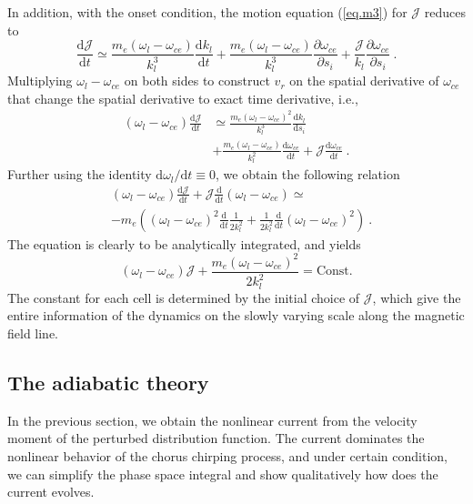In addition, with the onset condition, the motion equation (\ref{eq.m3}) for $\mathcal{J}$ reduces to
\begin{equation}
        \frac{\mathrm{d}\mathcal{J}}{\mathrm{d}t} \simeq  \frac{m_e(\omega_l - \omega_{ce})}{k_l^3} \frac{\mathrm{d} k_l}{\mathrm{d} t} + \frac{m_e(\omega_l - \omega_{ce})}{k_l^3} \frac{\partial \omega_{ce}}{\partial s_i}  +\frac{\mathcal{J}}{k_l}\frac{\partial \omega_{ce}}{\partial s_i}~.
\end{equation}
Multiplying $\omega_l - \omega_{ce}$ on both sides to construct $v_r$ on the spatial derivative of $\omega_{ce}$ that change the spatial derivative to exact time derivative, i.e., 
\begin{equation}
\begin{aligned}
    (\omega_l - \omega_{ce}) \frac{\mathrm{d}\mathcal{J}}{\mathrm{d}t} & \simeq \frac{m_e(\omega_l - \omega_{ce})^2}{k_l^3} \frac{\mathrm{d} k_l}{\mathrm{d} s_i} \\ 
    &+ \frac{m_e(\omega_l - \omega_{ce})}{k_l^2} \frac{\mathrm{d} \omega_{ce}}{\mathrm{d} t} + \mathcal{J}\frac{\mathrm{d} \omega_{ce}}{\mathrm{d} t}~.
\end{aligned}
\end{equation}
Further using the identity $\mathrm{d}\omega_l/\mathrm{d}t \equiv 0$, we obtain the following relation
\begin{equation}
\begin{aligned}
    &(\omega_l - \omega_{ce}) \frac{\mathrm{d}\mathcal{J}}{\mathrm{d}t} + \mathcal{J}\frac{\mathrm{d}}{\mathrm{d} t}(\omega_l - \omega_{ce}) \simeq 
    \\
    &- m_e\left((\omega_l - \omega_{ce})^2 \frac{\mathrm{d}}{\mathrm{d} t}\frac{1}{2 k_l^2} + \frac{1}{2 k_l^2} \frac{\mathrm{d}}{\mathrm{d} t}(\omega_l - \omega_{ce})^2\right)~.
\end{aligned}
\end{equation}
The equation is clearly to be analytically integrated, and yields
\begin{equation}\label{eq.Jcons}
    (\omega_l - \omega_{ce})\mathcal{J} +  \frac{m_e(\omega_l - \omega_{ce})^2}{2k_l^2} = \mathrm{Const.}
\end{equation}
The constant for each cell is determined by the initial choice of $\mathcal{J}$, which give the entire information of the dynamics on the slowly varying scale along the magnetic field line.

\subsection{The adiabatic theory}
In the previous section, we obtain the nonlinear current from the velocity moment of the perturbed distribution function. 
The current dominates the nonlinear behavior of the chorus chirping process, and under certain condition, we can simplify the phase space integral and show qualitatively how does the current evolves.


